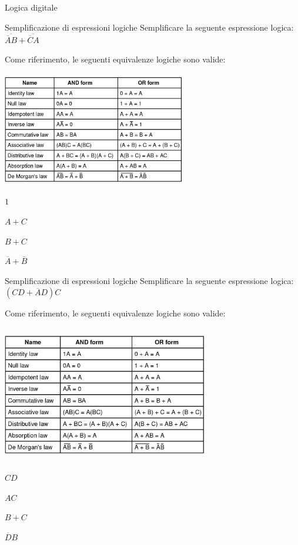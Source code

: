\documentclass[11pt]{article}
\begin{document}
\begin{quiz}{Logica digitale}

\begin{multi}[points=1,shuffle=true]{Semplificazione di espressioni logiche}
    Semplificare la seguente espressione logica: $\overline{\overline{A}B} + \overline{\overline{C}A}$

    Come riferimento, le seguenti equivalenze logiche sono valide: 

    \includegraphics[width=8cm,height=5cm]{figures/logica.png}

    \item* $1$
    \item $A + C$
    \item $B + C$
    \item $\overline{A} + \overline{B}$
\end{multi}

\begin{multi}[points=1,shuffle=true]{Semplificazione di espressioni logiche}
    Semplificare la seguente espressione logica: $(CD + \overline{A}D)C$

    Come riferimento, le seguenti equivalenze logiche sono valide:

    \includegraphics[width=9cm,height=6cm]{figures/logica.png}

    \item* $CD$
    \item $AC$
    \item $B + C$
    \item $\overline{D}B$
\end{multi}


\end{quiz}
\end{document}
